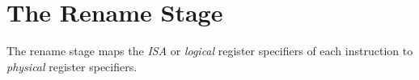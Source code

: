 \chapter{The Rename Stage}

The rename stage maps the {\em ISA} or {\em logical} register specifiers of each instruction to {\em physical} register specifiers. 

